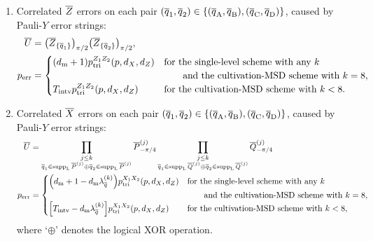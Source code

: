 \documentclass[
 prx,
 reprint,
 superscriptaddress,
 longbibliography,
 dvipsnames
]{revtex4-2}
\begin{document}
\begin{widetext}
\begin{enumerate}
    \item Correlated $\overline{Z}$ errors on each pair $(\overline{q}_{\text{1}}, \overline{q}_{\text{2}}) \in \{ (\overline{q}_{\text{A}}, \overline{q}_{\text{B}}), (\overline{q}_{\text{C}}, \overline{q}_{\text{D}}) \}$, caused by Pauli-$Y$ error strings:
    \begin{align*}
        \overline{U} &= \qty(\overline{Z}_\qty{\overline{q}_{\text{1}}})_{\pi/2} \qty(\overline{Z}_\qty{\overline{q}_{\text{2}}})_{\pi/2}, \\
        p_{\mathrm{err}} &= \begin{cases}
            \qty(d_{\mathrm{m}} + 1)p_{\mathrm{tri}}^{Z_1 Z_2}(p, {d_X}, {d_Z}) & \text{for the single-level scheme with any $k$} \\
            & \qquad \text{and the cultivation-MSD scheme with $k = 8$}, \\
            T_{\mathrm{intv}} p_{\mathrm{tri}}^{Z_1 Z_2}(p, {d_X}, {d_Z}) & \text{for the cultivation-MSD scheme with $k < 8$}.
        \end{cases}
    \end{align*}

    \item Correlated $\overline{X}$ errors on each pair $(\overline{q}_{\text{1}}, \overline{q}_{\text{2}}) \in \{ (\overline{q}_{\text{A}}, \overline{q}_{\text{B}}), (\overline{q}_{\text{C}}, \overline{q}_{\text{D}}) \}$, caused by Pauli-$Y$ error strings:
    \begin{align*}
        \overline{U} &= \prod_{\substack{j \leq k \\ \overline{q}_{\text{1}} \in \operatorname{supp}_{\mathrm{L}}\overline{P}^{(j)} \oplus \overline{q}_{\text{2}} \in \operatorname{supp}_{\mathrm{L}}\overline{P}^{(j)} }} \overline{P}^{(j)}_{-\pi/4} \prod_{\substack{j \leq k \\ \overline{q}_{\text{1}} \in \operatorname{supp}_{\mathrm{L}}\overline{Q}^{(j)} \oplus \overline{q}_{\text{2}} \in \operatorname{supp}_{\mathrm{L}}\overline{Q}^{(j)}}} \overline{Q}^{(j)}_{-\pi/4} \\
        p_{\mathrm{err}} &= \begin{cases}
            \qty(d_{\mathrm{m}} + 1 - d_{\mathrm{m}}\lambda_{\overline{q}_{\text{}}}^{(k)})p_{\mathrm{tri}}^{X_1 X_2}(p, {d_X}, {d_Z}) & \text{for the single-level scheme with any $k$} \\
            & \qquad \text{and the cultivation-MSD scheme with $k = 8$}, \\
            \qty[T_{\mathrm{intv}} - d_{\mathrm{m}}\lambda_{\overline{q}_{\text{}}}^{(k)}]p_{\mathrm{tri}}^{X_1 X_2}(p, {d_X}, {d_Z}) & \text{for the cultivation-MSD scheme with $k < 8$},
        \end{cases}
    \end{align*}
    where `$\oplus$' denotes the logical XOR operation.
    

\end{enumerate}
\end{widetext}
\end{document}
